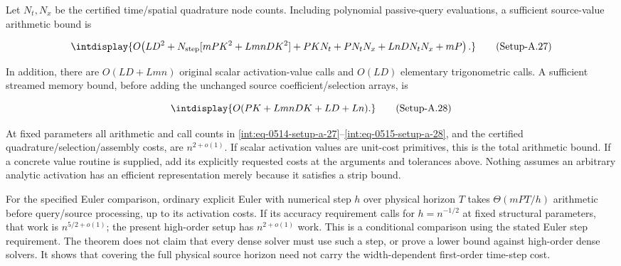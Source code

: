 
Let \(N_t,\allowbreak N_x\) be the certified time/spatial quadrature node counts. Including polynomial passive-query evaluations, a sufficient source-value arithmetic bound is


\label{int:eq-setup-a-27}
\begingroup\renewcommand{\theHequation}{intdisplay.994}
\begin{equation}
\intdisplay{
O\!\left(
LD^2+N_{\rm step}[mPK^2+LmnDK^2]
+PKN_t+PN_tN_x+LnDN_tN_x+mP
\right).
}
\tag{Setup-A.27}
\label{int:eq-0514-setup-a-27}
\end{equation}
\endgroup


In addition, there are \(O(LD+Lmn)\) original scalar activation-value calls and \(O(LD)\) elementary trigonometric calls. A sufficient streamed memory bound, before adding the unchanged source coefficient/selection arrays, is


\label{int:eq-setup-a-28}
\begingroup\renewcommand{\theHequation}{intdisplay.995}
\begin{equation}
\intdisplay{
O(PK+LmnDK+LD+Ln).
}
\tag{Setup-A.28}
\label{int:eq-0515-setup-a-28}
\end{equation}
\endgroup


At fixed parameters all arithmetic and call counts in \hyperref[int:eq-setup-a-27]{\eqref{int:eq-0514-setup-a-27}}--\allowbreak \hyperref[int:eq-setup-a-28]{\eqref{int:eq-0515-setup-a-28}}, and the certified quadrature/selection/assembly costs, are \(n^{2+o(1)}\). If scalar activation values are unit-cost primitives, this is the total arithmetic bound. If a concrete value routine is supplied, add its explicitly requested costs at the arguments and tolerances above. Nothing assumes an arbitrary analytic activation has an efficient representation merely because it satisfies a strip bound.



For the specified Euler comparison, ordinary explicit Euler with numerical step \(h\) over physical horizon \(T\) takes \(\Theta(mPT/h)\) arithmetic before query/source processing, up to its activation costs. If its accuracy requirement calls for \(h=n^{-1/2}\) at fixed structural parameters, that work is \(n^{5/2+o(1)}\); the present high-order setup has \(n^{2+o(1)}\) work. This is a conditional comparison using the stated Euler step requirement. The theorem does not claim that every dense solver must use such a step, or prove a lower bound against high-order dense solvers. It shows that covering the full physical source horizon need not carry the width-dependent first-order time-step cost.


